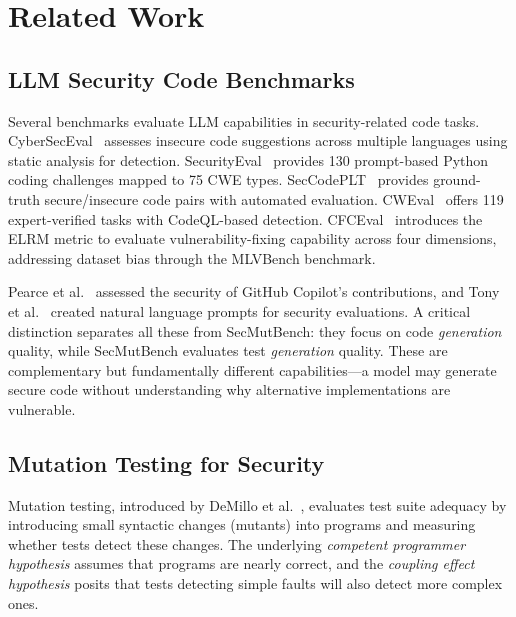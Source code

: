 \documentclass[sigconf,review,anonymous]{acmart}
\begin{document}
\section{Related Work}\label{sec:related}

\subsection{LLM Security Code Benchmarks}

Several benchmarks evaluate LLM capabilities in security-related code tasks. CyberSecEval~\cite{bhatt2023cyberseceval} assesses insecure code suggestions across multiple languages using static analysis for detection. SecurityEval~\cite{siddiq2022securityeval} provides 130 prompt-based Python coding challenges mapped to 75 CWE types. SecCodePLT~\cite{secccodeplt2024} provides ground-truth secure/insecure code pairs with automated evaluation. CWEval~\cite{yang2024cweval} offers 119 expert-verified tasks with CodeQL-based detection. CFCEval~\cite{cheng2025cfceval} introduces the ELRM metric to evaluate vulnerability-fixing capability across four dimensions, addressing dataset bias through the MLVBench benchmark.

Pearce et al.~\cite{pearce2022asleep} assessed the security of GitHub Copilot's contributions, and Tony et al.~\cite{tony2023llmseceval} created natural language prompts for security evaluations. A critical distinction separates all these from SecMutBench: they focus on code \emph{generation} quality, while SecMutBench evaluates test \emph{generation} quality. These are complementary but fundamentally different capabilities---a model may generate secure code without understanding why alternative implementations are vulnerable.

\subsection{Mutation Testing for Security}

Mutation testing, introduced by DeMillo et al.~\cite{demillo1978hints}, evaluates test suite adequacy by introducing small syntactic changes (mutants) into programs and measuring whether tests detect these changes. The underlying \emph{competent programmer hypothesis} assumes that programs are nearly correct, and the \emph{coupling effect hypothesis} posits that tests detecting simple faults will also detect more complex ones.
\end{document}
